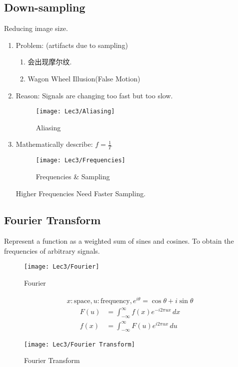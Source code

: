 \subsection{Down-sampling}
Reducing image size. 
\begin{enumerate}
    \item Problem: (artifacts due to sampling)
    \begin{enumerate}
        \item  会出现摩尔纹. 
        \item  Wagon Wheel Illusion(False Motion)
    \end{enumerate}
    \item Reason: Signals are changing too fast but  too slow. 
    \begin{figure}[H]
        \centering
        \texttt{[image: Lec3/Aliasing]}
        \caption{Aliasing}
    \end{figure}
    \item Mathematically describe: $f=\frac{1}{T}$
    \begin{figure}[H]
        \centering
        \texttt{[image: Lec3/Frequencies]}
        \caption{Frequencies \& Sampling}
    \end{figure}

    Higher Frequencies Need Faster Sampling.
\end{enumerate}
\subsection{Fourier Transform}
    Represent a function as a weighted sum of
    sines and cosines. To obtain the frequencies of arbitrary signals. 
     
    \begin{figure}[H]
        \centering
        \texttt{[image: Lec3/Fourier]}
        \caption{Fourier}
    \end{figure}
    \begin{align*}
        x:\text{space}, u: \text{frequency}, e^{i\theta}=\cos\theta+i\sin\theta
    \end{align*}
    \begin{align*}
        F(u)&=\int_{-\infty}^{\infty}f(x)e^{-i2\pi ux}\, dx\\
        f(x)&=\int_{-\infty}^{\infty}F(u)e^{i2\pi ux}\, du
    \end{align*}
    \begin{figure}[H]
        \centering
        \texttt{[image: Lec3/Fourier Transform]}
        \caption{Fourier Transform}
    \end{figure}

